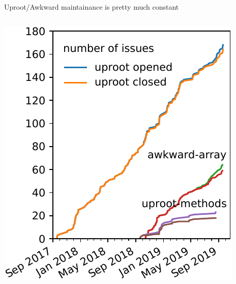 \documentclass[aspectratio=169]{beamer}
\begin{document}
\begin{frame}{Uproot/Awkward maintainance is pretty much constant}
\Large
\vspace{0.75 cm}
\begin{columns}
\includegraphics[width=\linewidth]{uproot-issues.pdf}


\end{columns}
\end{frame}
\end{document}
